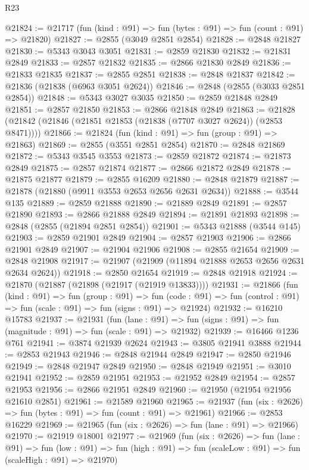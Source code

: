\begin{lexlean}{R23}
\begin{coremodule}
@21824 := @21717 (fun (kind : @91) => fun (bytes : @91) => fun (count : @91) => @21820)
@21827 := @2855 (@3049 @2851 @2854)
@21828 := @2848 @21827
@21830 := @5343 @3043 @3051
@21831 := @2859 @21830
@21832 := @21831 @2849
@21833 := @2857 @21832
@21835 := @2866 @21830 @2849
@21836 := @21833 @21835
@21837 := @2855 @2851
@21838 := @2848 @21837
@21842 := @21836 (@21838 (@6963 @3051 @2624))
@21846 := @2848 (@2855 (@3033 @2851 @2854))
@21848 := @5343 @3027 @3035
@21850 := @2859 @21848 @2849
@21851 := @2857 @21850
@21853 := @2866 @21848 @2849
@21863 := @21828 (@21842 (@21846 (@21851 @21853 (@21838 (@7707 @3027 @2624)) (@2853 @8471))))
@21866 := @21824 (fun (kind : @91) => fun (group : @91) => @21863)
@21869 := @2855 (@3551 @2851 @2854)
@21870 := @2848 @21869
@21872 := @5343 @3545 @3553
@21873 := @2859 @21872
@21874 := @21873 @2849
@21875 := @2857 @21874
@21877 := @2866 @21872 @2849
@21878 := @21875 @21877
@21879 := @2855 @16209
@21880 := @2848 @21879
@21887 := @21878 (@21880 (@9911 @3553 @2653 @2656 @2631 @2634))
@21888 := @3544 @135
@21889 := @2859 @21888
@21890 := @21889 @2849
@21891 := @2857 @21890
@21893 := @2866 @21888 @2849
@21894 := @21891 @21893
@21898 := @2848 (@2855 (@21894 @2851 @2854))
@21901 := @5343 @21888 (@3544 @145)
@21903 := @2859 @21901 @2849
@21904 := @2857 @21903
@21906 := @2866 @21901 @2849
@21907 := @21904 @21906
@21908 := @2855 @21654
@21909 := @2848 @21908
@21917 := @21907 (@21909 (@11894 @21888 @2653 @2656 @2631 @2634 @2624))
@21918 := @2850 @21654
@21919 := @2848 @21918
@21924 := @21870 (@21887 (@21898 (@21917 (@21919 @13833))))
@21931 := @21866
    (fun (kind : @91) =>
    fun (group : @91) =>
    fun (code : @91) => fun (control : @91) => fun (scale : @91) => fun (signs : @91) => @21924)
@21932 := @16210 @15783
@21937 := @21931
    (fun (lane : @91) => fun (signs : @91) => fun (magnitude : @91) => fun (scale : @91) => @21932)
@21939 := @16466 @1236 @761
@21941 := @3874 @21939 @2624
@21943 := @3805 @21941 @3888
@21944 := @2853 @21943
@21946 := @2848 @21944 @2849
@21947 := @2850 @21946
@21949 := @2848 @21947 @2849
@21950 := @2848 @21949
@21951 := @3010 @21941
@21952 := @2859 @21951
@21953 := @21952 @2849
@21954 := @2857 @21953
@21956 := @2866 @21951 @2849
@21960 := @21950 (@21954 @21956 @21610 @2851)
@21961 := @21589 @21960
@21965 := @21937 (fun (six : @2626) => fun (bytes : @91) => fun (count : @91) => @21961)
@21966 := @2853 @16229
@21969 := @21965 (fun (six : @2626) => fun (lane : @91) => @21966)
@21970 := @21919 @18001
@21977 := @21969
    (fun (six : @2626) =>
    fun (lane : @91) =>
    fun (low : @91) => fun (high : @91) => fun (scaleLow : @91) => fun (scaleHigh : @91) => @21970)

\end{coremodule}
\end{lexlean}
